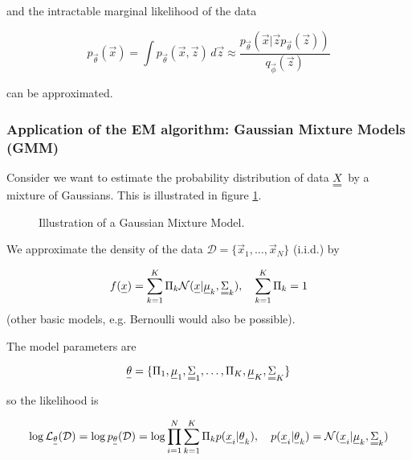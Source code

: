 and the intractable marginal likelihood of the data

\begin{equation}
    p_\vec{\theta}(\vec{x}) = \int p_\vec{\theta}(\vec{x}, \vec{z}) \, d\vec{z} \approx \frac{p_\vec{\theta}(\vec{x}|\vec{z} p_\vec{\theta}(\vec{z}))}{q_\vec{\phi}(\vec{z})}
\end{equation}

can be approximated.

\subsubsection{Application of the EM algorithm: Gaussian Mixture Models (GMM)}
Consider we want to estimate the probability distribution of data $\mat{X}$ by 
a mixture of Gaussians. This is illustrated in figure \ref{fig:gmm}.


\begin{figure}[!htb]
    \centering
    
    \caption{Illustration of a Gaussian Mixture Model.}
    \label{fig:gmm}
\end{figure}

We approximate the density of the data $\mathcal{D} = \{ \vec{x}_1, \dots, \vec{x}_N \}$ (i.i.d.) by

\begin{equation}
    f(\vec{x}) = \sum_{k=1}^{K} \Pi_k \mathcal{N}(\vec{x} | \vec{\mu}_k, \mat{\Sigma}_k), \quad \sum_{k=1}^{K} \Pi_k = 1
\end{equation}
(other basic models, e.g. Bernoulli would also be possible).

The model parameters are

\begin{equation}
    \vec{\theta} = \{ \Pi_1, \vec{\mu}_1, \mat{\Sigma}_1, \dots, \Pi_K, \vec{\mu}_K, \mat{\Sigma}_K \}
\end{equation}

so the likelihood is

\begin{equation}
    \log \mathcal{L}_{\vec{\theta}}(\mathcal{D}) = \log p_{\vec{\theta}}(\mathcal{D}) = \log \prod_{i=1}^{N} \sum_{k=1}^{K} \Pi_k p(\vec{x}_i | \vec{\theta}_k), \quad p(\vec{x}_i | \vec{\theta}_k) = \mathcal{N}(\vec{x}_i | \vec{\mu}_k, \mat{\Sigma}_k)
\end{equation}

